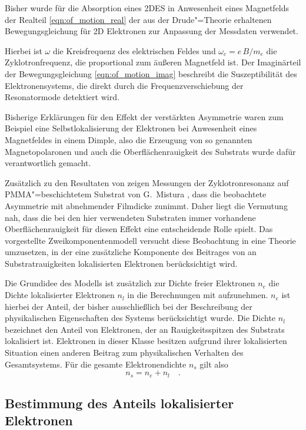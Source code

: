 Bisher wurde für die Absorption eines 2DES in Anwesenheit eines Magnetfelds der Realteil \eqref{eqn:of_motion_real} der aus der Drude"=Theorie erhaltenen Bewegungsgleichung für 2D Elektronen zur Anpassung der Messdaten verwendet.

Hierbei ist $\omega$ die Kreisfrequenz des elektrischen Feldes und $\omega_c=e\,B/m_e$ die Zyklotronfrequenz, die proportional zum äußeren Magnetfeld ist.
Der Imaginärteil der Bewegungsgleichung \eqref{eqn:of_motion_imag} beschreibt die Suszeptibilität des Elektronensystems, die direkt durch die Frequenzverschiebung der Resonatormode detektiert wird.

Bisherige Erklärungen für den Effekt der verstärkten Asymmetrie waren zum Beispiel eine Selbstlokalisierung der Elektronen bei Anwesenheit eines Magnetfeldes in einem Dimple, also die Erzeugung von so genannten Magnetopolaronen und auch die Oberflächenrauigkeit des Substrats wurde dafür verantwortlich gemacht.

Zusätzlich zu den Resultaten von  \cite{guenzler} zeigen Messungen der Zyklotronresonanz auf PMMA"=beschichtetem Substrat von G.~Mistura \cite{mistura}, dass die beobachtete Asymmetrie mit abnehmender Filmdicke zunimmt. Daher liegt die Vermutung nah, dass die bei den hier verwendeten Substraten immer vorhandene Oberflächenrauigkeit für diesen Effekt eine entscheidende Rolle spielt. Das vorgestellte Zweikomponentenmodell versucht diese Beobachtung in eine Theorie umzusetzen, in der eine zusätzliche Komponente des Beitrages von an Substratrauigkeiten lokalisierten Elektronen berücksichtigt wird.

Die Grundidee des Modells ist zusätzlich zur Dichte freier Elektronen $n_e$ die Dichte lokalisierter Elektronen $n_l$ in die Berechnungen mit aufzunehmen. $n_e$ ist hierbei der Anteil, der bisher ausschließlich bei der Beschreibung der physikalischen Eigenschaften des Systems berücksichtigt wurde. Die Dichte $n_l$ bezeichnet den Anteil von Elektronen, der an Rauigkeitsspitzen des Substrats lokalisiert ist. Elektronen in dieser Klasse besitzen aufgrund ihrer lokalisierten Situation einen anderen Beitrag zum physikalischen Verhalten des Gesamtsystems. Für die gesamte Elektronendichte $n_s$ gilt also
    \begin{equation}
            \label{eqn:two_fraction}
            n_s=n_e+n_l\quad.
    \end{equation}

\subsection{Bestimmung des Anteils lokalisierter Elektronen}


